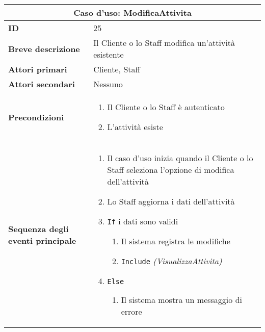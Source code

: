 \documentclass[a4paper]{report}
\begin{document}
\clearpage
\begin{table}[H]
\vspace*{-0cm}
\renewcommand{\arraystretch}{1.9}
\begin{tabular}{|p{3.9cm}|p{9.9cm}|}
\hline
\multicolumn{2}{|c|}{\textbf{Caso d’uso: ModificaAttivita}} \\ \hline
	\textbf{ID} & 25 \\ \hline
	\textbf{Breve descrizione} & Il Cliente o lo Staff modifica un’attività esistente \\ \hline
	\textbf{Attori primari} & Cliente, Staff \\ \hline
	\textbf{Attori secondari} & Nessuno \\ \hline
	\textbf{Precondizioni} & \begin{enumerate}[leftmargin=14pt,label=\arabic*.,labelsep=0.5em,topsep=0pt,partopsep=0pt,parsep=0pt,itemsep=0pt]
    \item Il Cliente o lo Staff è autenticato
    \item L’attività esiste
\end{enumerate} \\ \hline
	\textbf{Sequenza degli eventi principale} & \begin{enumerate}[leftmargin=14pt,label=\arabic*.,labelsep=0.5em,topsep=0pt,partopsep=0pt,parsep=0pt,itemsep=0pt]
    \item Il caso d'uso inizia quando il Cliente o lo Staff seleziona l'opzione di modifica dell'attività
    \item Lo Staff aggiorna i dati dell’attività
    \item \texttt{If} i dati sono validi
    \begin{enumerate}[label=\arabic{enumi}.\arabic*.,leftmargin=22pt,labelsep=0.5em,topsep=0pt,partopsep=0pt,parsep=0pt,itemsep=0pt]
        \item Il sistema registra le modifiche
        \item \texttt{Include} \textit{(VisualizzaAttivita)}
    \end{enumerate}
    \item \texttt{Else}
    \begin{enumerate}[label=\arabic{enumi}.\arabic*.,leftmargin=22pt,labelsep=0.5em,topsep=0pt,partopsep=0pt,parsep=0pt,itemsep=0pt]
        \item Il sistema mostra un messaggio di errore
    \end{enumerate}
\end{enumerate} \\ \hline

\end{tabular}
\end{table}
\end{document}
